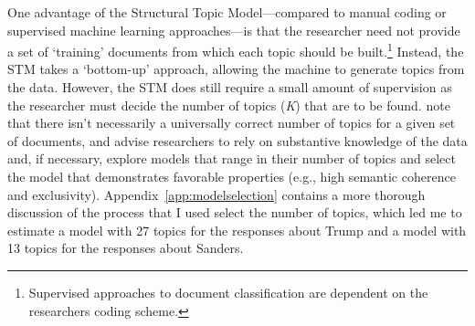 \documentclass[12pt]{article}
\begin{document}
One advantage of the Structural Topic Model---compared to manual coding or supervised machine learning approaches---is that the researcher need not provide a set of `training' documents from which each topic should be built.\footnote{Supervised approaches to document classification are dependent on the researchers coding scheme.} Instead, the STM takes a `bottom-up' approach, allowing the machine to generate topics from the data. However, the STM does still require a small amount of supervision as the researcher must decide the number of topics (\textit{K}) that are to be found. \textcite{roberts2019stm} note that there isn't necessarily a universally correct number of topics for a given set of documents, and advise researchers to rely on substantive knowledge of the data and, if necessary, explore models that range in their number of topics and select the model that demonstrates favorable properties (e.g., high semantic coherence and exclusivity). Appendix~\ref{app:modelselection} contains a more thorough discussion of the process that I used select the number of topics, which led me to estimate a model with 27 topics for the responses about Trump and a model with 13 topics for the responses about Sanders. 

\end{document}
